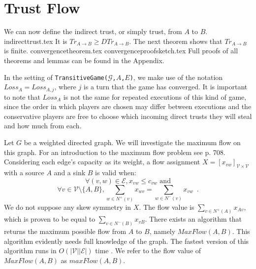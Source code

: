 \section{Trust Flow}
  We can now define the indirect trust, or simply trust, from $A$ to $B$.
  {indirecttrust.tex}
  \noindent It is $Tr_{A \rightarrow B} \geq DTr_{A \rightarrow B}$. The next theorem shows that
  $Tr_{A \rightarrow B}$ is finite.
  {convergencetheorem.tex}
  {convergenceproofsketch.tex}
  Full proofs of all theorems and lemmas can be found in the Appendix.

  In the setting of \texttt{TransitiveGame(}$\mathcal{G}$\texttt{,}$A$\texttt{,}$E$\texttt{)}, we make use of the notation
  $Loss_A = Loss_{A, j}$, where $j$ is a turn that the game has converged. It is important to note that $Loss_A$ is
  not the same for repeated executions of this kind of game, since the order in which players are chosen may differ between
  executions and the conservative players are free to choose which incoming direct trusts they will steal and how much from
  each.

  Let $G$ be a weighted directed graph. We will investigate the maximum flow on this graph. For an introduction to the
  maximum flow problem see \cite{clrs} p. 708. Considering each edge's capacity as its weight, a flow assignment
  $X = [x_{vw}]_{\mathcal{V} \times \mathcal{V}}$ with a source $A$ and a sink $B$ is valid when:
  \begin{equation}
  \label{flow1}
     \forall (v, w) \in \mathcal{E}, x_{vw} \leq c_{vw} \mbox{ and}
  \end{equation}
  \begin{equation}
  \label{flow2}
     \forall v \in \mathcal{V} \setminus \{A,B\}, \sum\limits_{w \in N^{+}(v)}x_{wv} = \sum\limits_{w \in N^{-}(v)}x_{vw}
     \enspace.
  \end{equation}
  We do not suppose any skew symmetry in $X$. The flow value is $\sum\limits_{v \in N^{+}\left(A\right)}x_{Av}$, which is
  proven to be equal to $\sum\limits_{v \in N^{-}\left(B\right)}x_{vB}$. There exists an algorithm that returns the maximum
  possible flow from $A$ to $B$, namely $MaxFlow\left(A, B\right)$. This algorithm evidently needs full knowledge of the
  graph. The fastest version of this algorithm runs in $O\left(|\mathcal{V}||\mathcal{E}|\right)$ time \cite{maxflownm}. We
  refer to the flow value of $MaxFlow\left(A, B\right)$ as $maxFlow\left(A, B\right)$.

